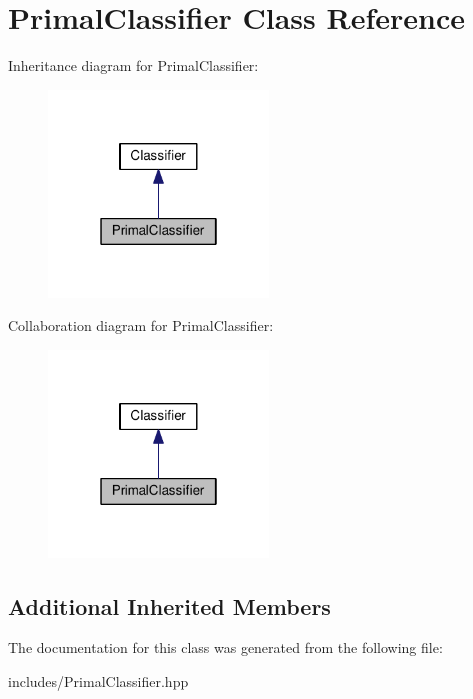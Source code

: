 \hypertarget{class_primal_classifier}{}\section{Primal\+Classifier Class Reference}
\label{class_primal_classifier}


Inheritance diagram for Primal\+Classifier\+:\nopagebreak
\begin{figure}[H]
\begin{center}
\leavevmode
\includegraphics[width=166pt]{class_primal_classifier__inherit__graph}
\end{center}
\end{figure}


Collaboration diagram for Primal\+Classifier\+:\nopagebreak
\begin{figure}[H]
\begin{center}
\leavevmode
\includegraphics[width=166pt]{class_primal_classifier__coll__graph}
\end{center}
\end{figure}
\subsection*{Additional Inherited Members}


The documentation for this class was generated from the following file\+:\begin{DoxyCompactItemize}
\item 
includes/Primal\+Classifier.\+hpp\end{DoxyCompactItemize}
